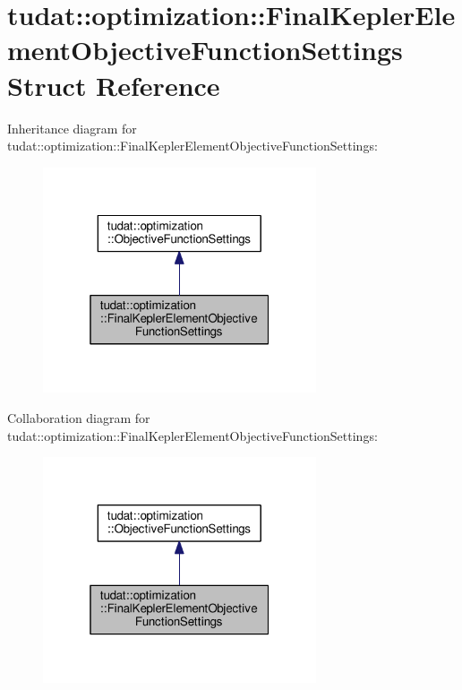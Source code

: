 \hypertarget{structtudat_1_1optimization_1_1FinalKeplerElementObjectiveFunctionSettings}{}\section{tudat\+:\+:optimization\+:\+:Final\+Kepler\+Element\+Objective\+Function\+Settings Struct Reference}
\label{structtudat_1_1optimization_1_1FinalKeplerElementObjectiveFunctionSettings}


Inheritance diagram for tudat\+:\+:optimization\+:\+:Final\+Kepler\+Element\+Objective\+Function\+Settings\+:
\nopagebreak
\begin{figure}[H]
\begin{center}
\leavevmode
\includegraphics[width=229pt]{structtudat_1_1optimization_1_1FinalKeplerElementObjectiveFunctionSettings__inherit__graph}
\end{center}
\end{figure}


Collaboration diagram for tudat\+:\+:optimization\+:\+:Final\+Kepler\+Element\+Objective\+Function\+Settings\+:
\nopagebreak
\begin{figure}[H]
\begin{center}
\leavevmode
\includegraphics[width=229pt]{structtudat_1_1optimization_1_1FinalKeplerElementObjectiveFunctionSettings__coll__graph}
\end{center}
\end{figure}

